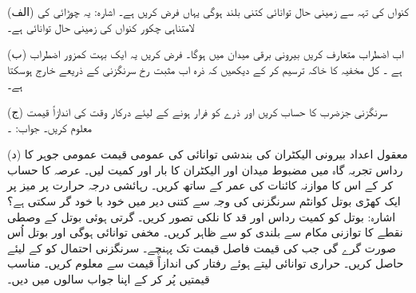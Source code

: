 (الف) کنواں کی تہہ سے زمینی حال توانائی کتنی بلند ہوگی یہاں فرض کریں  ہے۔ اشارہ: یہ  چوڑائی کی لامتناہی چکور کنواں کی زمینی حال توانائی ہے۔

(ب) اب اضطراب  متعارف کریں بیرونی برقی میدان  میں  ہوگا۔ فرض کریں یہ ایک بہت کمزور اضطراب ہے ۔ کل مخفیہ کا خاکہ ترسیم کر کے دیکھیں کہ ذرہ اب مثبت  رخ سرنگزنی کے ذریعے خارج ہوسکتا ہے۔

(ج) سرنگزنی جزضرب   کا حساب کریں اور ذرے کو فرار ہونے کے لیئے درکار وقت کی اندازاً قیمت  معلوم کریں۔ جواب: ۔

(د) معقول اعداد  بیرونی الیکٹران کی بندشی توانائی کی عمومی قیمت  عمومی جوہر کا رداس  تجربہ گاہ میں مضبوط میدان  اور  الیکٹران کا بار اور کمیت لیں۔ عرصہ  کا حساب کر کے اس کا موازنہ کائنات کی عمر کے ساتھ کریں۔
رہائشی درجہ حرارت پر میز پر ایک کھڑی بوتل کوانٹم سرنگزنی کی وجہ سے کتنی دیر میں خود با خود گر سکتی ہے؟ اشارہ: بوتل کو کمیت  رداس  اور قد  کا نلکی تصور کریں۔ گرتی ہوئی بوتل کے وصطی نقطے کا توازنی مکام  سے بلندی کو  سے ظاہر کریں۔ مخفی توانائی  ہوگی اور بوتل اُس صورت گرے گی جب  کی قیمت فاصل قیمت  تک پہنچے۔ سرنگزنی احتمال  کو  کے لیئے حاصل کریں۔ حراری توانائی  لیتے ہوئے رفتار کی اندازاً 	قیمت  سے معلوم کریں۔ مناسب قیمتیں پُر کر کے اپنا جواب سالوں میں دیں۔

